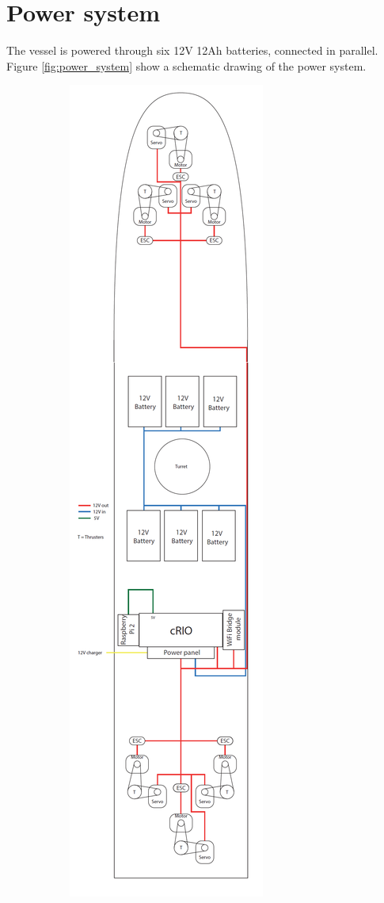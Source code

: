 \section{Power system}
The vessel is powered through six 12V 12Ah batteries, connected in parallel. Figure \ref{fig:power_system} show a schematic drawing of the power system.

\begin{figure}[h!]
	\centering
	\begin{subfigure}{0.3\textwidth}
		\centering
		\includegraphics[height=0.9\textheight]{fig/power_system.png}

\end{subfigure}
\end{figure}

